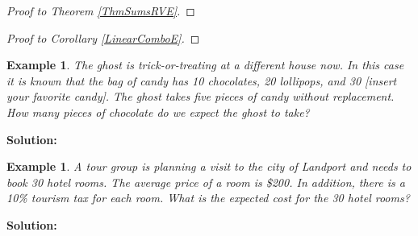 \documentclass[12pt]{amsart}
\newtheorem{example}[theorem]{Example}
\begin{document}
{%
\begin{proof}[Proof to Theorem \ref{ThmSumsRVE}]

\end{proof}

\newpage

\begin{proof}[Proof to Corollary \ref{LinearComboE}]

\end{proof}

\newpage

\begin{example}\label{GhostHypergeoTrickTreat}
The ghost is trick-or-treating at a different house now. In this case it is known that the bag of candy has 10 chocolates, 20 lollipops, and 30 [\textit{insert your favorite candy}]. The ghost takes five pieces of candy without replacement. \newline
How many pieces of chocolate do we expect the ghost to take?
\end{example}

\textbf{Solution:}




\newpage

 
\begin{example}\label{LandportHotels}
A tour group is planning a visit to the city of Landport and needs to book 30 hotel rooms. 
The average price of a room is \$200. In addition, there is a 10\% tourism tax for each room.
\newline
What is the expected cost for the 30 hotel rooms?
\end{example}

\textbf{Solution:}



}  %
\end{document}
